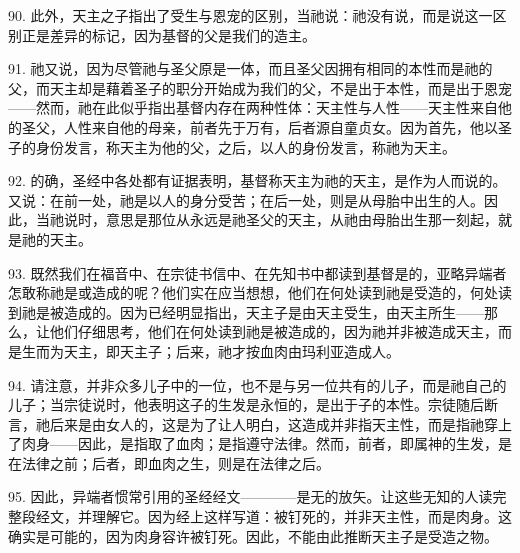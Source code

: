 90. 此外，天主之子指出了受生与恩宠的区别，当祂说：祂没有说，而是说这一区别正是差异的标记，因为基督的父是我们的造主。\par

91. 祂又说，因为尽管祂与圣父原是一体，而且圣父因拥有相同的本性而是祂的父，而天主却是藉着圣子的职分开始成为我们的父，不是出于本性，而是出于恩宠——然而，祂在此似乎指出基督内存在两种性体：天主性与人性——天主性来自他的圣父，人性来自他的母亲，前者先于万有，后者源自童贞女。因为首先，他以圣子的身份发言，称天主为他的父，之后，以人的身份发言，称祂为天主。\par

92. 的确，圣经中各处都有证据表明，基督称天主为祂的天主，是作为人而说的。又说：在前一处，祂是以人的身分受苦；在后一处，则是从母胎中出生的人。因此，当祂说时，意思是那位从永远是祂圣父的天主，从祂由母胎出生那一刻起，就是祂的天主。\par

93. 既然我们在福音中、在宗徒书信中、在先知书中都读到基督是的，亚略异端者怎敢称祂是或造成的呢？他们实在应当想想，他们在何处读到祂是受造的，何处读到祂是被造成的。因为已经明显指出，天主子是由天主受生，由天主所生——那么，让他们仔细思考，他们在何处读到祂是被造成的，因为祂并非被造成天主，而是生而为天主，即天主子；后来，祂才按血肉由玛利亚造成人。\par

94. 请注意，并非众多儿子中的一位，也不是与另一位共有的儿子，而是祂自己的儿子；当宗徒说时，他表明这子的生发是永恒的，是出于子的本性。宗徒随后断言，祂后来是由女人的，这是为了让人明白，这造成并非指天主性，而是指祂穿上了肉身——因此，是指取了血肉；是指遵守法律。然而，前者，即属神的生发，是在法律之前；后者，即血肉之生，则是在法律之后。\par

\par

95. 因此，异端者惯常引用的圣经经文————是无的放矢。让这些无知的人读完整段经文，并理解它。因为经上这样写道：被钉死的，并非天主性，而是肉身。这确实是可能的，因为肉身容许被钉死。因此，不能由此推断天主子是受造之物。\par

